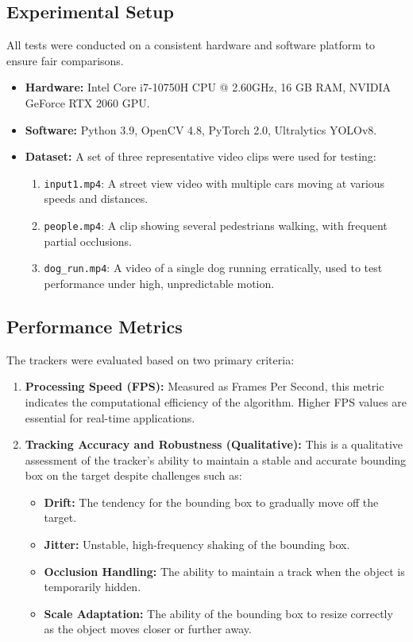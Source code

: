 \documentclass[12pt, a4paper]{article}
\begin{document}
\subsection{Experimental Setup}
All tests were conducted on a consistent hardware and software platform to ensure fair comparisons.
\begin{itemize}
    \item \textbf{Hardware:} Intel Core i7-10750H CPU @ 2.60GHz, 16 GB RAM, NVIDIA GeForce RTX 2060 GPU.
    \item \textbf{Software:} Python 3.9, OpenCV 4.8, PyTorch 2.0, Ultralytics YOLOv8.
    \item \textbf{Dataset:} A set of three representative video clips were used for testing:
    \begin{enumerate}
        \item \texttt{input1.mp4}: A street view video with multiple cars moving at various speeds and distances.
        \item \texttt{people.mp4}: A clip showing several pedestrians walking, with frequent partial occlusions.
        \item \lstinline!dog_run.mp4!: A video of a single dog running erratically, used to test performance under high, unpredictable motion.
    \end{enumerate}
\end{itemize}

\subsection{Performance Metrics}
The trackers were evaluated based on two primary criteria:
\begin{enumerate}
    \item \textbf{Processing Speed (FPS):} Measured as Frames Per Second, this metric indicates the computational efficiency of the algorithm. Higher FPS values are essential for real-time applications.
    \item \textbf{Tracking Accuracy and Robustness (Qualitative):} This is a qualitative assessment of the tracker's ability to maintain a stable and accurate bounding box on the target despite challenges such as:
    \begin{itemize}
        \item \textbf{Drift:} The tendency for the bounding box to gradually move off the target.
        \item \textbf{Jitter:} Unstable, high-frequency shaking of the bounding box.
        \item \textbf{Occlusion Handling:} The ability to maintain a track when the object is temporarily hidden.
        \item \textbf{Scale Adaptation:} The ability of the bounding box to resize correctly as the object moves closer or further away.
    \end{itemize}
\end{enumerate}
\end{document}
